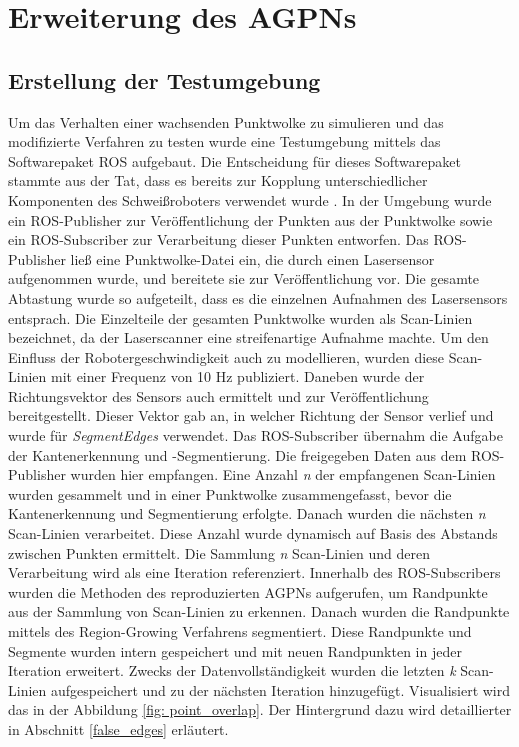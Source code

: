 \section{Erweiterung des AGPNs}
\subsection{Erstellung der Testumgebung}
Um das Verhalten einer wachsenden Punktwolke zu simulieren und das modifizierte Verfahren zu testen wurde eine Testumgebung mittels das Softwarepaket ROS aufgebaut. Die Entscheidung für dieses Softwarepaket stammte aus der Tat, dass es bereits zur Kopplung unterschiedlicher Komponenten des Schweißroboters verwendet wurde \autocite[39]{savla_intelligente_2022}. In der Umgebung wurde ein ROS-Publisher zur Veröffentlichung der Punkten aus der Punktwolke sowie ein ROS-Subscriber zur Verarbeitung dieser Punkten entworfen. Das ROS-Publisher ließ eine Punktwolke-Datei ein, die durch einen Lasersensor aufgenommen wurde, und bereitete sie zur Veröffentlichung vor. Die gesamte Abtastung wurde so aufgeteilt, dass es die einzelnen Aufnahmen des Lasersensors entsprach. Die Einzelteile der gesamten Punktwolke wurden als Scan-Linien bezeichnet, da der Laserscanner eine streifenartige Aufnahme machte. Um den Einfluss der Robotergeschwindigkeit auch zu modellieren, wurden diese Scan-Linien mit einer Frequenz von 10 Hz publiziert. Daneben wurde der Richtungsvektor des Sensors auch ermittelt und zur Veröffentlichung bereitgestellt. Dieser Vektor gab an, in welcher Richtung der Sensor verlief und wurde für \textit{SegmentEdges} verwendet. Das ROS-Subscriber übernahm die Aufgabe der Kantenerkennung und -Segmentierung. Die freigegeben Daten aus dem ROS-Publisher wurden hier empfangen. Eine Anzahl \textit{n} der empfangenen Scan-Linien wurden gesammelt und in einer Punktwolke zusammengefasst, bevor die Kantenerkennung und Segmentierung erfolgte. Danach wurden die nächsten \textit{n} Scan-Linien verarbeitet. Diese Anzahl wurde dynamisch auf Basis des Abstands zwischen Punkten ermittelt. Die Sammlung \textit{n} Scan-Linien und deren Verarbeitung wird als eine Iteration referenziert. Innerhalb des ROS-Subscribers wurden die Methoden des reproduzierten AGPNs aufgerufen, um Randpunkte aus der Sammlung von Scan-Linien zu erkennen. Danach wurden die Randpunkte mittels des Region-Growing Verfahrens segmentiert. Diese Randpunkte und Segmente wurden intern gespeichert und mit neuen Randpunkten in jeder Iteration erweitert. Zwecks der Datenvollständigkeit wurden die letzten \textit{k} Scan-Linien aufgespeichert und zu der nächsten Iteration hinzugefügt. Visualisiert wird das in der Abbildung \ref{fig: point_overlap}. Der Hintergrund dazu wird detaillierter in Abschnitt \ref{false_edges} erläutert.

